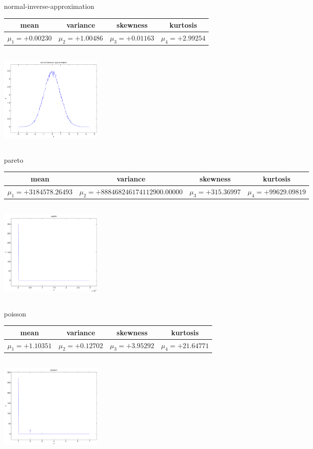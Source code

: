 \documentclass[9pt]{article}
\theoremstyle{plain}
\theoremstyle{definition}
\theoremstyle{remark}
\numberwithin{equation}{section}
\begin{document}
\newpage
normal-inverse-approximation \begin{tabular}{|c|c|c|c|}  mean & variance & skewness & kurtosis \\  \hline
$\mu_1 = +0.00230$ & $\mu_2 = +1.00486$ & $\mu_3 = +0.01163$ & $\mu_4 =+2.99254$ \\
\end{tabular}

\includegraphics[width=5cm,height=5cm]{normal-inverse-approximation.pdf}

pareto \begin{tabular}{|c|c|c|c|}  mean & variance & skewness & kurtosis \\  \hline
$\mu_1 = +3184578.26493$ & $\mu_2 = +888468246174112900.00000$ & $\mu_3 = +315.36997$ & $\mu_4 =+99629.09819$ \\
\end{tabular}

\includegraphics[width=5cm,height=5cm]{pareto.pdf}

poisson \begin{tabular}{|c|c|c|c|}  mean & variance & skewness & kurtosis \\  \hline
$\mu_1 = +1.10351$ & $\mu_2 = +0.12702$ & $\mu_3 = +3.95292$ & $\mu_4 =+21.64771$ \\
\end{tabular}

\includegraphics[width=5cm,height=5cm]{poisson.pdf}
\end{document}
